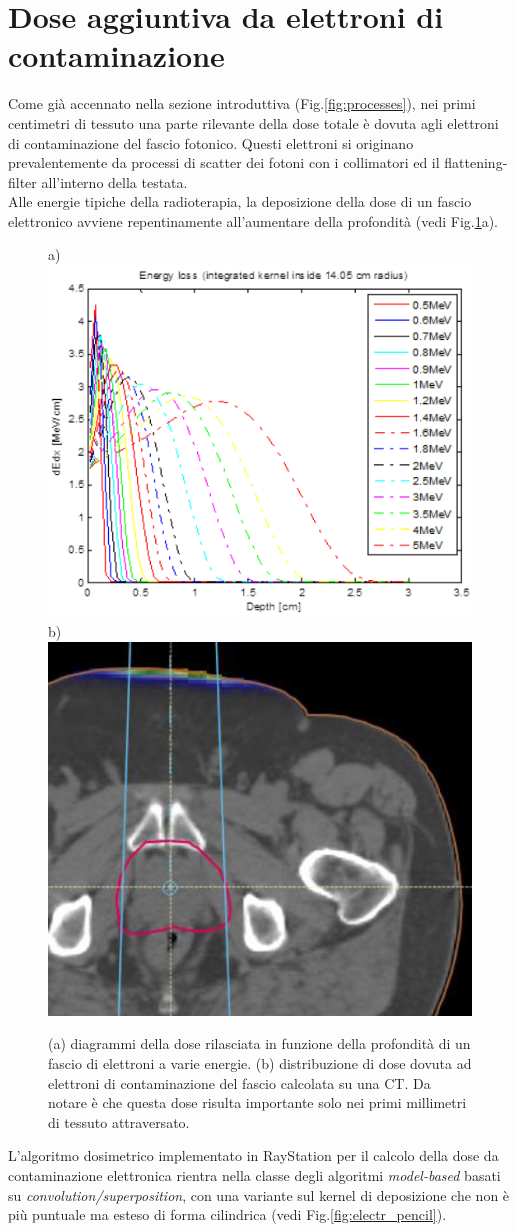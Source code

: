 {\section{Dose aggiuntiva da elettroni di contaminazione}
\label{sec:dose_electr}
Come già accennato nella sezione introduttiva (Fig.\ref{fig:processes}), nei primi centimetri di tessuto una parte rilevante della dose totale è dovuta agli elettroni di contaminazione del fascio fotonico. Questi elettroni si originano prevalentemente da processi di scatter dei fotoni con i collimatori ed il flattening-filter all'interno della testata.\\
Alle energie tipiche della radioterapia, la deposizione della dose di un fascio elettronico avviene repentinamente all'aumentare della profondità (vedi Fig.\ref{fig:electr_enloss}a).
\begin{figure}
\centering
a) \includegraphics[width=.45\textwidth]{./cap1/electr_enloss.png}
b) \includegraphics[width=.4\textwidth]{./cap1/electr_doseCT.png}
\caption{(a) diagrammi della dose rilasciata in funzione della profondità di un fascio di elettroni a varie energie. (b) distribuzione di dose dovuta ad elettroni di contaminazione del fascio calcolata su una CT. Da notare è che questa dose risulta importante solo nei primi millimetri di tessuto attraversato.}
\label{fig:electr_enloss}
\end{figure}

L'algoritmo dosimetrico implementato in RayStation per il calcolo della dose da contaminazione elettronica rientra nella classe degli algoritmi \textit{model-based} basati su \textit{convolution/superposition}, con una variante sul kernel di deposizione che non è più puntuale ma esteso di forma cilindrica (vedi Fig.\ref{fig:electr_pencil}). 

}
